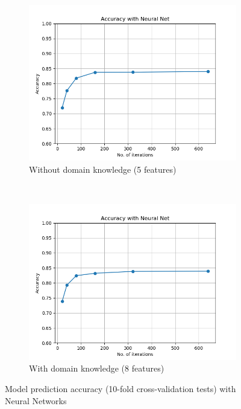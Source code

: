\documentclass{article}
\begin{document}
\begin{figure}[h!]
    \centering
    \begin{subfigure}[b]{0.45\textwidth}
        \includegraphics[width=\textwidth]{figures/wo_domain_knowledge/accuracy_neural_nets.png}
        \caption{Without domain knowledge (5  features)}
        \label{fig:gull}
    \end{subfigure}
    ~ %
    \begin{subfigure}[b]{0.45\textwidth}
        \includegraphics[width=\textwidth]{figures/w_domain_knowledge/accuracy_neural_nets.png}
        \caption{With domain knowledge (8  features)}
        \label{fig:tiger}
    \end{subfigure}
    \caption{Model prediction accuracy (10-fold cross-validation tests) with Neural Networks}\label{fig:nn}
\end{figure}
\end{document}
